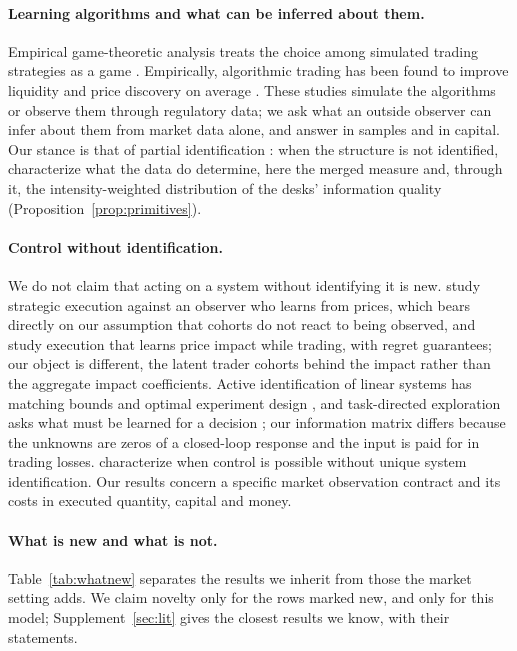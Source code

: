 \documentclass[12pt]{article}
\theoremstyle{definition}
\theoremstyle{remark}
\begin{document}
\paragraph{Learning algorithms and what can be inferred about them.} Empirical game-theoretic analysis treats the choice among simulated trading strategies as a game \citep{wellman2006}. Empirically, algorithmic trading has been found to improve liquidity and price discovery on average \citep{hendershott2011,brogaard2014}. These studies simulate the algorithms or observe them through regulatory data; we ask what an outside observer can infer about them from market data alone, and answer in samples and in capital. Our stance is that of partial identification \citep{manski2003}: when the structure is not identified, characterize what the data do determine, here the merged measure and, through it, the intensity-weighted distribution of the desks' information quality (Proposition~\ref{prop:primitives}).
\paragraph{Control without identification.} We do not claim that acting on a system without identifying it is new. \citet{moallemi2008} study strategic execution against an observer who learns from prices, which bears directly on our assumption that cohorts do not react to being observed, and \citet{parkvanroy2015} study execution that learns price impact while trading, with regret guarantees; our object is different, the latent trader cohorts behind the impact rather than the aggregate impact coefficients. Active identification of linear systems has matching bounds and optimal experiment design \citep{wagenmaker2020}, and task-directed exploration asks what must be learned for a decision \citep{wagenmaker2021}; our information matrix differs because the unknowns are zeros of a closed-loop response and the input is paid for in trading losses. \citet{vanwaarde2020} characterize when control is possible without unique system identification. Our results concern a specific market observation contract and its costs in executed quantity, capital and money.
\paragraph{What is new and what is not.} Table~\ref{tab:whatnew} separates the results we inherit from those the market setting adds. We claim novelty only for the rows marked new, and only for this model; Supplement~\ref{sec:lit} gives the closest results we know, with their statements.
\end{document}
